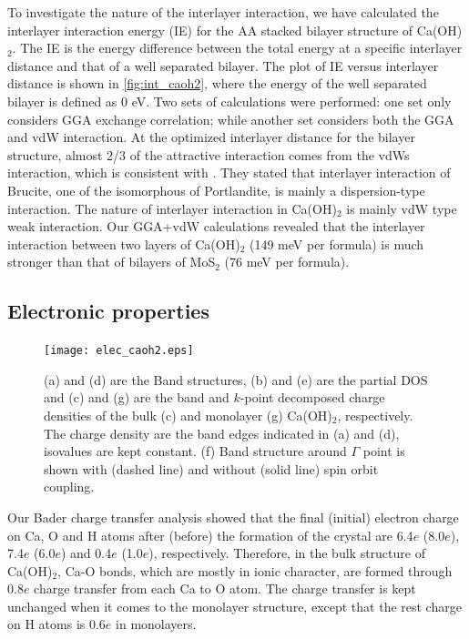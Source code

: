 To investigate the nature of the interlayer interaction, we 
have calculated the interlayer interaction energy (IE) for the AA stacked 
bilayer structure of Ca(OH)$_2$. The IE is the energy difference between the 
total energy at a specific interlayer distance and that of a well
separated bilayer. The plot of IE versus interlayer distance is shown in \autoref{fig:int_caoh2}, where the energy of the  well separated bilayer is defined as 
0 eV. Two sets of calculations were performed: one set only considers GGA 
exchange correlation; while another set considers both the GGA and vdW 
interaction. At the optimized interlayer distance for the bilayer structure, 
almost 2/3 of the attractive interaction comes from the vdWs 
interaction, which is consistent with \citet{DArco1993} . They stated that
interlayer interaction of Brucite, one of the isomorphous of Portlandite, is
mainly a dispersion-type interaction. The nature of interlayer interaction in Ca(OH)$_2$ is mainly vdW type weak interaction. Our GGA+vdW calculations revealed that the interlayer interaction between two layers of Ca(OH)$_2$ (149 meV per formula) is much stronger than that of bilayers of MoS$_2$ (76 meV per formula).


\subsection{Electronic properties}\label{sec:electronic}

\begin{figure}[htb]
\centering
\texttt{[image: elec\_caoh2.eps]}
\caption{\label{fig:elec_caoh2} (a) and (d) are the Band structures, 
(b) and (e) are the partial DOS and (c) and (g) are the band and $k$-point decomposed charge densities of the bulk (c) and monolayer (g) Ca(OH)$_2$, respectively. The charge density are the band edges indicated in (a) and (d), isovalues are kept constant. (f) Band structure around $\Gamma$ point is shown with (dashed line) and without (solid line) spin orbit coupling. }
\end{figure}

Our Bader charge transfer analysis showed that the final (initial) electron 
charge on Ca, O and H atoms after (before) the formation of the crystal are 
6.4$e$ (8.0$e$), 7.4$e$ (6.0$e$) and 0.4$e$ (1.0$e$), respectively. Therefore, 
in the bulk structure of Ca(OH)$_2$, Ca-O bonds, which are 
mostly in ionic character, are formed through 0.8$e$ charge transfer 
from each Ca to O atom.  The charge transfer is kept unchanged when it comes to the monolayer structure, except that the rest charge on H atoms is 0.6$e$ in monolayers.

